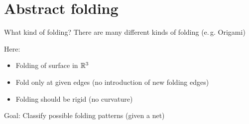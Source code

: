 \section{Abstract folding}
\frame{\tableofcontents[currentsection]}

\begin{frame}{What kind of folding?}
    \pause
    There are many different kinds of folding (e.\,g. Origami)

    \pause
    Here:
    \begin{itemize}
        \pause
        \item Folding of surface in $\mathbb{R}^3$
        \pause
        \item Fold only at given edges (no introduction of new folding edges)
        \pause
        \item Folding should be rigid (no curvature)
    \end{itemize}

    \pause
    Goal: Classify possible folding patterns (given a net)

    \pause
    \begin{center}
    \end{center}

\end{frame}


